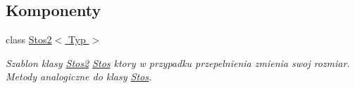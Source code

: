 \subsection*{Komponenty}
\begin{DoxyCompactItemize}
\item 
class \hyperlink{class_stos2}{Stos2$<$ Typ $>$}
\begin{DoxyCompactList}\small\item\em Szablon klasy \hyperlink{class_stos2}{Stos2} \hyperlink{class_stos}{Stos} ktory w przypadku przepelnienia zmienia swoj rozmiar. Metody analogiczne do klasy \hyperlink{class_stos}{Stos}. \end{DoxyCompactList}\end{DoxyCompactItemize}

